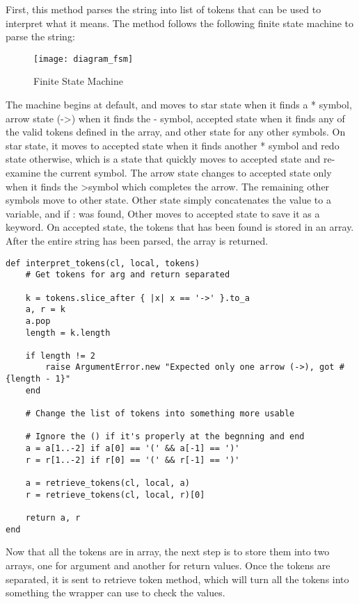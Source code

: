 First, this method parses the string into list of tokens that can be used to interpret what it means.  The method follows the following finite state machine to parse the string:

\begin{figure}[H]
\caption{Finite State Machine}
\texttt{[image: diagram\_fsm]}
\centering
\end{figure}

The machine begins at default, and moves to star state when it finds a {*} symbol, arrow state ({-}\textgreater) when it finds the {-} symbol, accepted state when it finds any of the valid tokens defined in the array, and other state for any other symbols.  On star state, it moves to accepted state when it finds another {*} symbol and redo state otherwise, which is a state that quickly moves to accepted state and re-examine the current symbol.  The arrow state changes to accepted state only when it finds the \textgreater symbol which completes the arrow.  The remaining other symbols move to other state.  Other state simply concatenates the value to a variable, and if {:} was found, Other moves to accepted state to save it as a keyword.  On accepted state, the tokens that has been found is stored in an array.  After the entire string has been parsed, the array is returned.

\begin{lstlisting}[caption={Interpreter method}]
def interpret_tokens(cl, local, tokens)
    # Get tokens for arg and return separated

    k = tokens.slice_after { |x| x == '->' }.to_a
    a, r = k
    a.pop
    length = k.length

    if length != 2
        raise ArgumentError.new "Expected only one arrow (->), got #{length - 1}"
    end

    # Change the list of tokens into something more usable

    # Ignore the () if it's properly at the begnning and end
    a = a[1..-2] if a[0] == '(' && a[-1] == ')'
    r = r[1..-2] if r[0] == '(' && r[-1] == ')'

    a = retrieve_tokens(cl, local, a)
    r = retrieve_tokens(cl, local, r)[0]

    return a, r
end
\end{lstlisting}

Now that all the tokens are in array, the next step is to store them into two arrays, one for argument and another for return values.  Once the tokens are separated, it is sent to retrieve token method, which will turn all the tokens into something the wrapper can use to check the values.

